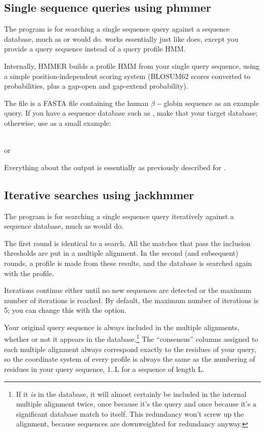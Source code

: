 \subsection{Single sequence queries using phmmer}

The  program is for searching a single sequence query
against a sequence database, much as  or 
would do.  works essentially just like 
does, except you provide a query sequence instead of a query profile
HMM. 

Internally, HMMER builds a profile HMM from your single query
sequence, using a simple position-independent scoring system (BLOSUM62
scores converted to probabilities, plus a gap-open and gap-extend
probability).

The file  is a FASTA file containing the
human $\beta-$globin sequence as an example query. If you have a
sequence database such as , make that your
target database; otherwise, use  as a
small example:

\\
or\\

Everything about the output is essentially as previously described for
. 


\subsection{Iterative searches using jackhmmer}

The  program is for searching a single sequence query
iteratively against a sequence database, much as 
would do. 

The first round is identical to a  search. All the
matches that pass the inclusion thresholds are put in a multiple
alignment. In the second (and subsequent) rounds, a profile is made
from these results, and the database is searched again with the
profile.

Iterations continue either until no new sequences are detected or the
maximum number of iterations is reached. By default, the maximum
number of iterations is 5; you can change this with the 
option.

Your original query sequence is always included in the multiple
alignments, whether or not it appears in the database.\footnote{If it
  \emph{is} in the database, it will almost certainly be included in
  the internal multiple alignment twice, once because it's the query
  and once because it's a significant database match to itself. This
  redundancy won't screw up the alignment, because sequences are
  downweighted for redundancy anyway.}  
The ``consensus'' columns assigned to each multiple alignment always
correspond exactly to the residues of your query, so the coordinate
system of every profile is always the same as the numbering of
residues in your query sequence, 1..L for a sequence of length L.

